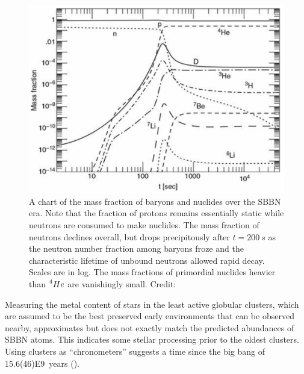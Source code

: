 \documentclass{paper}
\begin{document}
  \begin{figure}[H]
    \begin{centering}
    \includegraphics[scale=0.4]{BBN-frac.pdf}
    \caption{A chart of the mass fraction of baryons and nuclides over the
      SBBN era. Note that the fraction of protons remains essentially static
      while neutrons are consumed to make nuclides. The mass fraction of 
      neutrons declines overall, but drops precipitously after 
      \(t = \SI{200}{s}\) as the neutron number fraction among baryons froze 
      and the characteristic lifetime of unbound neutrons allowed rapid decay.
      Scales are in log. The mass fractions of primordial nuclides heavier
      than \(\prescript{4}{}{He}\) are vanishingly small.
    Credit: \cite{ryden2003introduction}}
    \label{fig:BBN-frac}
    \end{centering}
  \end{figure}

  Measuring the metal content of stars in the least active globular clusters, 
  which are assumed to be the best preserved early environments that can be 
  observed nearby, approximates but does not exactly match the predicted 
  abundances of SBBN atoms. This indicates some stellar processing prior to 
  the oldest clusters. Using clusters as ``chronometers'' suggests a time 
  since the big bang of \SI{15.6(46)E9}{years} (\cite{1999ApJ...521..194C}).

\end{document}
